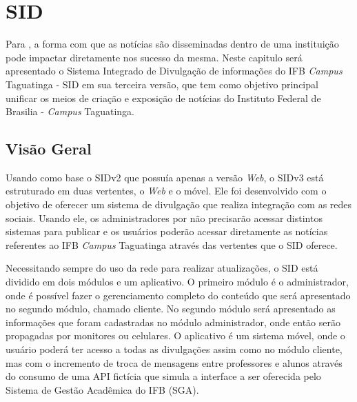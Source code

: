 \chapter[SID]{SID}
\label{cap:sid}
Para \cite{pinheiro2010}, a forma com que as notícias são disseminadas dentro de uma instituição pode impactar diretamente nos sucesso da mesma. Neste capitulo será apresentado o Sistema Integrado de Divulgação de informações do IFB \textit{Campus} Taguatinga - SID em sua terceira versão, que tem como objetivo principal unificar os meios de criação e exposição de notícias do Instituto Federal de Brasilia - \textit{Campus} Taguatinga. 



\section{Visão Geral} 
Usando como base o SIDv2 que possuía apenas a versão \textit{Web}, o SIDv3 está estruturado em duas vertentes, o \textit{Web} e o móvel. Ele foi desenvolvido com o objetivo de oferecer um sistema de divulgação que realiza integração com as redes sociais. Usando ele, os administradores por não precisarão acessar distintos sistemas para publicar e os usuários poderão acessar diretamente as notícias referentes ao IFB \textit{Campus} Taguatinga através das vertentes que o SID oferece.

Necessitando sempre do uso da rede para realizar atualizações, o SID está dividido em dois módulos e um aplicativo. O primeiro módulo é o administrador, onde é possível fazer o gerenciamento completo do conteúdo que será apresentado no segundo módulo, chamado cliente. No segundo módulo será apresentado as informações que foram cadastradas no módulo administrador, onde então serão propagadas por monitores ou celulares. O aplicativo é um sistema móvel, onde o usuário poderá ter acesso a todas as divulgações assim como no módulo cliente, mas com o incremento de troca de mensagens entre professores e alunos através do consumo de uma API fictícia que simula a interface a ser oferecida pelo Sistema de Gestão Acadêmica do IFB (SGA).

